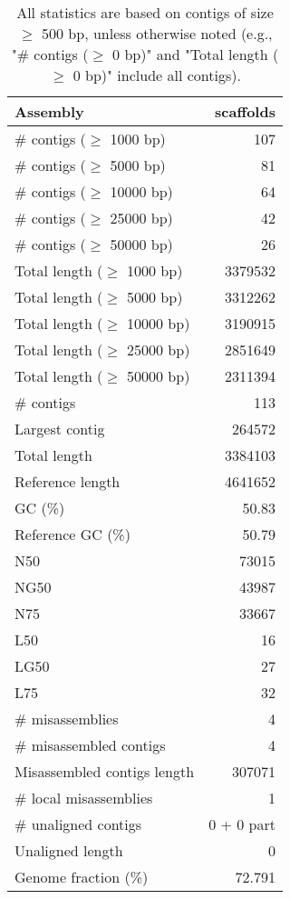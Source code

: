 \documentclass[12pt,a4paper]{article}
\begin{document}
\begin{table}[ht]
\begin{center}
\caption{All statistics are based on contigs of size $\geq$ 500 bp, unless otherwise noted (e.g., "\# contigs ($\geq$ 0 bp)" and "Total length ($\geq$ 0 bp)" include all contigs).}
\begin{tabular}{|l*{1}{|r}|}
\hline
Assembly & scaffolds \\ \hline
\# contigs ($\geq$ 1000 bp) & 107 \\ \hline
\# contigs ($\geq$ 5000 bp) & 81 \\ \hline
\# contigs ($\geq$ 10000 bp) & 64 \\ \hline
\# contigs ($\geq$ 25000 bp) & 42 \\ \hline
\# contigs ($\geq$ 50000 bp) & 26 \\ \hline
Total length ($\geq$ 1000 bp) & 3379532 \\ \hline
Total length ($\geq$ 5000 bp) & 3312262 \\ \hline
Total length ($\geq$ 10000 bp) & 3190915 \\ \hline
Total length ($\geq$ 25000 bp) & 2851649 \\ \hline
Total length ($\geq$ 50000 bp) & 2311394 \\ \hline
\# contigs & 113 \\ \hline
Largest contig & 264572 \\ \hline
Total length & 3384103 \\ \hline
Reference length & 4641652 \\ \hline
GC (\%) & 50.83 \\ \hline
Reference GC (\%) & 50.79 \\ \hline
N50 & 73015 \\ \hline
NG50 & 43987 \\ \hline
N75 & 33667 \\ \hline
L50 & 16 \\ \hline
LG50 & 27 \\ \hline
L75 & 32 \\ \hline
\# misassemblies & 4 \\ \hline
\# misassembled contigs & 4 \\ \hline
Misassembled contigs length & 307071 \\ \hline
\# local misassemblies & 1 \\ \hline
\# unaligned contigs & 0 + 0 part \\ \hline
Unaligned length & 0 \\ \hline
Genome fraction (\%) & 72.791 \\ \hline

\end{tabular}
\end{center}
\end{table}
\end{document}
